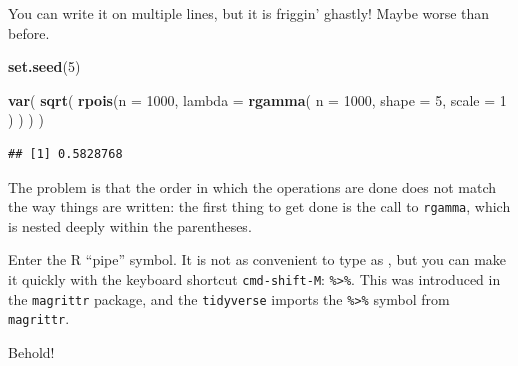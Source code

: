 \documentclass[]{book}
\newenvironment{Shaded}{\begin{snugshade}}{\end{snugshade}}
\newcommand{\KeywordTok}[1]{\textcolor[rgb]{0.13,0.29,0.53}{\textbf{{#1}}}}
\newcommand{\DataTypeTok}[1]{\textcolor[rgb]{0.13,0.29,0.53}{{#1}}}
\newcommand{\DecValTok}[1]{\textcolor[rgb]{0.00,0.00,0.81}{{#1}}}
\newcommand{\StringTok}[1]{\textcolor[rgb]{0.31,0.60,0.02}{{#1}}}
\newcommand{\CommentTok}[1]{\textcolor[rgb]{0.56,0.35,0.01}{\textit{{#1}}}}
\newcommand{\NormalTok}[1]{{#1}}
\theoremstyle{definition}
\theoremstyle{definition}
\theoremstyle{remark}
\begin{document}
You can write it on multiple lines, but it is friggin' ghastly! Maybe
worse than before.

\begin{Shaded}
\begin{Highlighting}[]
\KeywordTok{set.seed}\NormalTok{(}\DecValTok{5}\NormalTok{)}

\KeywordTok{var}\NormalTok{(}
  \KeywordTok{sqrt}\NormalTok{(}
    \KeywordTok{rpois}\NormalTok{(}\DataTypeTok{n =} \DecValTok{1000}\NormalTok{, }\DataTypeTok{lambda =} \KeywordTok{rgamma}\NormalTok{(}
      \DataTypeTok{n =} \DecValTok{1000}\NormalTok{, }\DataTypeTok{shape =} \DecValTok{5}\NormalTok{, }\DataTypeTok{scale =} \DecValTok{1}
    \NormalTok{)}
    \NormalTok{)}
  \NormalTok{)}
\NormalTok{)}
\end{Highlighting}
\end{Shaded}

\begin{verbatim}
## [1] 0.5828768
\end{verbatim}

The problem is that the order in which the operations are done does not
match the way things are written: the first thing to get done is the
call to \texttt{rgamma}, which is nested deeply within the parentheses.

Enter the R ``pipe'' symbol. It is not as convenient to type as
\texttt{\textbar{}}, but you can make it quickly with the keyboard
shortcut \texttt{cmd-shift-M}: \texttt{\%\textgreater{}\%}. This was
introduced in the \texttt{magrittr} package, and the \texttt{tidyverse}
imports the \texttt{\%\textgreater{}\%} symbol from \texttt{magrittr}.

Behold!

\begin{Shaded}
\end{Shaded}
\end{document}

